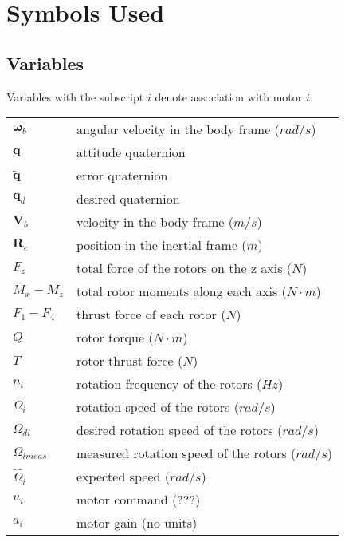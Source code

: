 \documentclass{article}
\numberwithin{equation}{section} %
\newcommand{\bs}[1]{\boldsymbol{#1}}
\begin{document}
\section{Symbols Used}

\subsection{Variables}

Variables with the subscript $i$ denote association with motor $i$.\\
\begin{longtable}{p{2cm}p{8cm}}
 	$ \bs{\omega}_{b} $ 	& angular velocity in the body frame ($rad/s$) \\
 	$ \mathbf{q} $ 			& attitude quaternion \\
 	$ \tilde{\mathbf{q}} $	& error quaternion \\
 	$ \mathbf{q}_d $		& desired quaternion \\
 	$ \boldsymbol{V}_{b} $ 	& velocity in the body frame ($m/s$) \\
 	$ \boldsymbol{R}_{e} $	& position in the inertial frame ($m$) \\
 	$ F_{z} $				& total force of the rotors on the z axis ($N$) \\
 	$ M_{x} - M_{z} $		& total rotor moments along each axis ($N \cdot m$) \\
 	$ F_{1} - F_{4} $		& thrust force of each rotor ($N$) \\
 	$ Q $					& rotor torque ($N \cdot m$) \\
 	$ T $					& rotor thrust force ($N$) \\
 	$ n_i $					& rotation frequency of the rotors ($Hz$) \\
 	$ \Omega_i $			& rotation speed of the rotors ($rad / s$) \\	
 	$ \Omega_{di} $			& desired rotation speed of the rotors ($rad / s$) \\
 	$ \Omega_{imeas} $		& measured rotation speed of the rotors ($rad / s$) \\
 	$ \hat{\Omega}_i $		& expected speed ($rad / s$) \\
 	$ u_i $					& motor command ($???$) \\
 	$ a_i $					& motor gain (no units) \\

\end{longtable}
\end{document}
